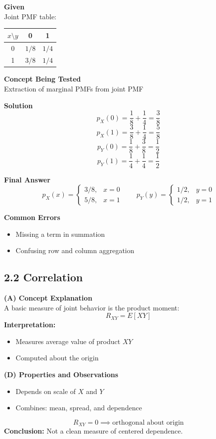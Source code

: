 \documentclass[12pt]{article}
\begin{document}
\textbf{Given} \\
Joint PMF table:
\begin{center}
\begin{tabular}{|c|c|c|}
\hline
$x \setminus y$ & 0 & 1 \\
\hline
0 & $1/8$ & $1/4$ \\
\hline
1 & $3/8$ & $1/4$ \\
\hline
\end{tabular}
\end{center}

\textbf{Concept Being Tested} \\
Extraction of marginal PMFs from joint PMF

\textbf{Solution}
\[ \boxed{p_{X}(0)=\frac{1}{8}+\frac{1}{4}=\frac{3}{8}} \]
\[ \boxed{p_{X}(1)=\frac{3}{8}+\frac{1}{4}=\frac{5}{8}} \]
\[ \boxed{p_{Y}(0)=\frac{1}{8}+\frac{3}{8}=\frac{1}{2}} \]
\[ \boxed{p_{Y}(1)=\frac{1}{4}+\frac{1}{4}=\frac{1}{2}} \]

\textbf{Final Answer}
\[ p_{X}(x)=\begin{cases} 3/8, & x=0 \\ 5/8, & x=1 \end{cases} \quad \quad p_{Y}(y)=\begin{cases} 1/2, & y=0 \\ 1/2, & y=1 \end{cases} \]

\textbf{Common Errors}
\begin{itemize}[noitemsep]
    \item Missing a term in summation
    \item Confusing row and column aggregation
\end{itemize}

\hrulefill

\subsection*{2.2 Correlation}

\textbf{(A) Concept Explanation} \\
A basic measure of joint behavior is the product moment:
\[ \boxed{R_{XY}=E[XY]} \]
\textbf{Interpretation:}
\begin{itemize}[noitemsep]
    \item Measures average value of product $XY$
    \item Computed about the origin
\end{itemize}

\textbf{(D) Properties and Observations}
\begin{itemize}[noitemsep]
    \item Depends on scale of $X$ and $Y$
    \item Combines: mean, spread, and dependence
\end{itemize}
\[ \boxed{R_{XY}=0 \implies \text{orthogonal about origin}} \]
\textbf{Conclusion:} Not a clean measure of centered dependence.
\end{document}

